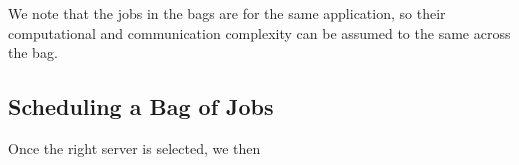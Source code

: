 We note that the jobs in the bags are for the same application, so their computational and communication complexity can be assumed to the same across the bag. 


\subsection{Scheduling a Bag of Jobs}

Once the right server is selected, we then 




\begin{comment}

  Our server selection policy is empirical and black-box in nature in that we don't assume an application model.
However due to the bag of jobs execution model, we do not need to special pilot jobs, but the jobs for doing the profiling come from the bag itself.


Thus given a desired allocation, \sysname's server selection policies select the ``best'' server type for a given application. 

One of key characteristics of transient cloud computing is the heterogeneity and diversity in the server configurations offered by most cloud platforms. 
Different configurations or types of servers have different prices 

\end{comment}



